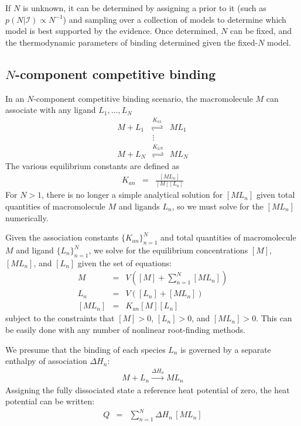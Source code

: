 \documentclass[aps,pre,twocolumn,nofootinbib,superscriptaddress,linenumbers]{revtex4-1}
\begin{document}
\begin{widetext}
If $N$ is unknown, it can be determined by assigning a prior to it (such as $p(N | \mathcal{I}) \propto N^{-1}$) and sampling over a collection of models to determine which model is best supported by the evidence.
Once determined, $N$ can be fixed, and the thermodynamic parameters of binding determined given the fixed-$N$ model.

\subsection{$N$-component competitive binding}
\label{section:N-component-binding}

In an $N$-component competitive binding scenario, the macromolecule $M$ can associate with any ligand $L_1, \ldots, L_N$
\begin{eqnarray}
M + L_1 &\overset{K_{a1}}{\rightleftharpoons}& ML_1 \nonumber \\
&\vdots& \nonumber \\
M + L_N &\overset{K_{aN}}{\rightleftharpoons}& ML_N
\end{eqnarray}
The various equilibrium constants are defined as
\begin{eqnarray}
K_{an} &=& \frac{[ML_n]}{[M][L_n]}
\end{eqnarray}
For $N > 1$, there is no longer a simple analytical solution for $[ML_n]$ given total quantities of macromolecule $M$ and ligands $L_n$, so we must solve for the $[ML_n]$ numerically.

Given the association constants $\{K_{an}\}_{n=1}^N$ and total quantities of macromolecule $M$ and ligand $\{L_n\}_{n=1}^N$, we solve for the equilibrium concentrations $[M]$, $[ML_n]$, and $[L_n]$ given the set of equations:
\begin{eqnarray}
M &=& V \left([M] + \sum_{n=1}^N [ML_n]\right) \nonumber \\
L_n &=& V({[L_n]} + {[ML_n]}) \nonumber \\
{[ML_n]} &=& K_{an} [M] [L_n]
\end{eqnarray}
subject to the constraints that $[M] > 0$, $[L_n] > 0$, and $[ML_n] > 0$.
This can be easily done with any number of nonlinear root-finding methods.

We presume that the binding of each species $L_n$ is governed by a separate enthalpy of association $\Delta H_n$:
\begin{eqnarray}
M + L_n \overset{\Delta H_n}{\rightarrow} ML_n
\end{eqnarray}
Assigning the fully dissociated state a reference heat potential of zero, the heat potential can be written:
\begin{eqnarray}
Q &=& \sum_{n=1}^N \Delta H_n \, [ML_n]
\end{eqnarray}



\end{widetext}
\end{document}
